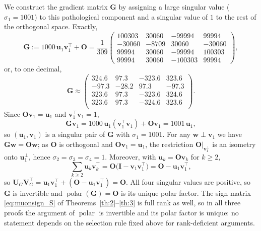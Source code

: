 We construct the gradient matrix $\mathbf{G}$ by assigning a large singular value ($\sigma_1 = 1001$) to this pathological component and a singular value of $1$ to the rest of the orthogonal space. Exactly,
\begin{equation}\label{eq:th1_G}
\mathbf{G} := 1000\,\mathbf{u}_1\mathbf{v}_1^\top+\mathbf{O}
= \frac{1}{309}\begin{pmatrix}
100303 & 30060 & -99994 & 99994\\
-30060 & -8709 & 30060 & -30060\\
99994 & 30060 & -99994 & 100303\\
99994 & 30060 & -100303 & 99994
\end{pmatrix},
\end{equation}
or, to one decimal,
\begin{equation}
    \mathbf{G} \approx \begin{pmatrix}
        324.6 & 97.3 & -323.6 & 323.6 \\
        -97.3 & -28.2 & 97.3 & -97.3 \\
        323.6 & 97.3 & -323.6 & 324.6 \\
        323.6 & 97.3 & -324.6 & 323.6 \\
      \end{pmatrix}.
\end{equation}
Since $\mathbf{O}\mathbf{v}_1=\mathbf{u}_1$ and $\mathbf{v}_1^\top\mathbf{v}_1=1$,
\[
\mathbf{G}\mathbf{v}_1 = 1000\,\mathbf{u}_1(\mathbf{v}_1^\top\mathbf{v}_1)+\mathbf{O}\mathbf{v}_1 = 1001\,\mathbf{u}_1,
\]
so $(\mathbf{u}_1,\mathbf{v}_1)$ is a singular pair of $\mathbf{G}$ with $\sigma_1=1001$. For any $\mathbf{w}\perp\mathbf{v}_1$ we have
$\mathbf{G}\mathbf{w}=\mathbf{O}\mathbf{w}$; as $\mathbf{O}$ is orthogonal and $\mathbf{O}\mathbf{v}_1=\mathbf{u}_1$, the restriction
$\mathbf{O}|_{\mathbf{v}_1^\perp}$ is an isometry onto $\mathbf{u}_1^\perp$, hence $\sigma_2=\sigma_3=\sigma_4=1$. Moreover, with
$\mathbf{u}_k=\mathbf{O}\mathbf{v}_k$ for $k\ge2$,
\[
\textstyle\sum_{k\ge2}\mathbf{u}_k\mathbf{v}_k^\top=\mathbf{O}\bigl(\mathbf{I}-\mathbf{v}_1\mathbf{v}_1^\top\bigr)=\mathbf{O}-\mathbf{u}_1\mathbf{v}_1^\top,  
\]
so $\mathbf{U}_G\mathbf{V}_G^\top=\mathbf{u}_1\mathbf{v}_1^\top+(\mathbf{O}-\mathbf{u}_1\mathbf{v}_1^\top)=\mathbf{O}$. All four singular values are positive, so $\mathbf{G}$ is invertible and $\operatorname{polar}(\mathbf{G})=\mathbf{O}$ is its unique polar factor. The sign matrix \eqref{eq:muonsign_S} of Theorems~\ref{th:2}--\ref{th:3} is full rank as well, so in all three proofs the argument of $\operatorname{polar}$ is invertible and its polar factor is unique: no statement depends on the selection rule fixed above for rank-deficient arguments.

